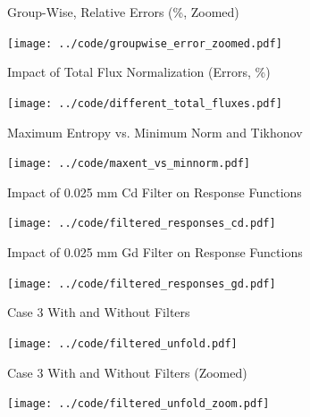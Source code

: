 \documentclass[fleqn]{beamer}
\begin{document}
    \begin{frame}{Group-Wise, Relative Errors (\%, Zoomed)}
         \begin{center}
             \texttt{[image: ../code/groupwise\_error\_zoomed.pdf]}
         \end{center}
    \end{frame}
    
    \begin{frame}{Impact of Total Flux Normalization (Errors, \%)}
         \begin{center}
             \texttt{[image: ../code/different\_total\_fluxes.pdf]}
         \end{center}
    \end{frame}

    \begin{frame}{Maximum Entropy vs. Minimum Norm and Tikhonov}
         \begin{center}
             \texttt{[image: ../code/maxent\_vs\_minnorm.pdf]}
         \end{center}
    \end{frame}  
    
    \begin{frame}{Impact of 0.025 mm Cd Filter on Response Functions}
         \begin{center}
             \texttt{[image: ../code/filtered\_responses\_cd.pdf]}
         \end{center}
    \end{frame}  
    
    
    \begin{frame}{Impact of 0.025 mm Gd Filter on Response Functions}
         \begin{center}
             \texttt{[image: ../code/filtered\_responses\_gd.pdf]}
         \end{center}
    \end{frame}  
    
    
    \begin{frame}{Case 3 With and Without Filters}
         \begin{center}
             \texttt{[image: ../code/filtered\_unfold.pdf]}
         \end{center}
    \end{frame}  
    
    \begin{frame}{Case 3 With and Without Filters (Zoomed)}
         \begin{center}
             \texttt{[image: ../code/filtered\_unfold\_zoom.pdf]}
         \end{center}
    \end{frame}  
    
\end{document}
